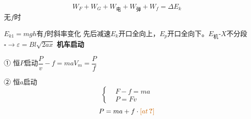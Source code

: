 \[
W_F+W_G+W_{\text{电}}+W_{\text{弹}}+W_f=\Delta E_k
\]
无$f$时

$E_{k1}=mgh$\qquad\qquad 有$f$时\quad 斜率变化
先后减速\qquad $E_k$开口全向上，$E_p$开口全向下。$E_{\text{机}}$-$X$不分段 %
$\square\to$\quad $\varepsilon=Bl\sqrt{2ax}$\quad {}
\textbf{机车启动}

① 恒$P$启动\qquad $\dfrac{P}{v}-f=ma$\qquad $V_m=\dfrac{P}{f}$

② 恒$a$启动
\[
\left\{\begin{aligned}
&F-f=ma\\
&P=Fv
\end{aligned}\right.
\]
\[
P=ma+f\cdot\unclear{at}
\]
